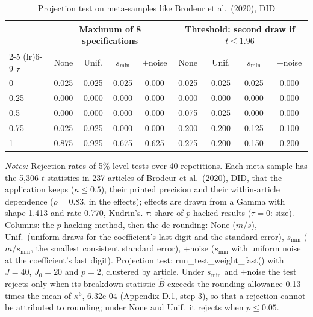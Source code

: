 \begin{table}[htbp]
\centering
\caption{Projection test on meta-samples like Brodeur et al.\ (2020), DID}
\label{tab:brodeur_did_power_proj}
\footnotesize
\setlength{\tabcolsep}{4pt}
\begin{tabular}{lcccccccc}
\toprule
 & \multicolumn{4}{c}{Maximum of 8 specifications} & \multicolumn{4}{c}{Threshold: second draw if $t \le 1.96$} \\
\cmidrule(lr){2-5} \cmidrule(lr){6-9}
$\tau$ & None & Unif. & $s_{\min}$ & $+$noise & None & Unif. & $s_{\min}$ & $+$noise \\
\midrule
0 & 0.025 & 0.025 & 0.025 & 0.000 & 0.025 & 0.025 & 0.025 & 0.000 \\
0.25 & 0.000 & 0.000 & 0.000 & 0.000 & 0.000 & 0.000 & 0.000 & 0.000 \\
0.5 & 0.000 & 0.000 & 0.000 & 0.000 & 0.075 & 0.025 & 0.000 & 0.000 \\
0.75 & 0.025 & 0.025 & 0.000 & 0.000 & 0.200 & 0.200 & 0.125 & 0.100 \\
1 & 0.875 & 0.925 & 0.675 & 0.625 & 0.275 & 0.200 & 0.150 & 0.200 \\
\bottomrule
\end{tabular}
\par\smallskip
\begin{minipage}{\linewidth}\footnotesize\textit{Notes:} Rejection rates of 5\%-level tests over 40 repetitions. Each meta-sample has the 5{,}306 $t$-statistics in 237 articles of Brodeur et al.\ (2020), DID, that the application keeps ($\kappa \le 0.5$), their printed precision and their within-article dependence ($\rho = 0.83$, in the effects); effects are drawn from a Gamma with shape 1.413 and rate 0.770, Kudrin's. $\tau$: share of $p$-hacked results ($\tau = 0$: size). Columns: the $p$-hacking method, then the de-rounding: None ($m/s$), Unif.\ (uniform draws for the coefficient's last digit and the standard error), $s_{\min}$ ($m/s_{\min}$, the smallest consistent standard error), $+$noise ($s_{\min}$ with uniform noise at the coefficient's last digit). Projection test: run\_test\_weight\_fast() with $J = 40$, $J_0 = 20$ and $p = 2$, clustered by article. Under $s_{\min}$ and $+$noise the test rejects only when its breakdown statistic $\hat B$ exceeds the rounding allowance 0.13 times the mean of $\kappa^6$, 6.32e-04 (Appendix D.1, step 3), so that a rejection cannot be attributed to rounding; under None and Unif.\ it rejects when $p \le 0.05$.\end{minipage}
\end{table}
